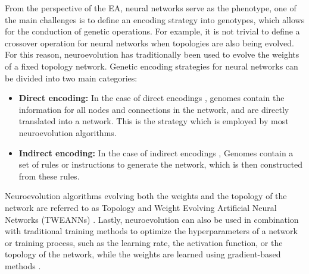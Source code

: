 From the perspective of the EA, neural networks serve as the phenotype, one of the main challenges is to define an encoding strategy into genotypes, which
allows for the conduction of genetic operations. For example, it is not trivial to define a crossover operation for neural networks when topologies are also
being evolved. For this reason, neuroevolution has traditionally  been used to evolve the weights of a fixed topology network. Genetic encoding strategies
for neural networks can be divided into two main categories:

\begin{itemize}
    \item \textbf{Direct encoding:} In the case of direct encodings \cite{neuroevolution_learning,neuroevolution_trends,neuroevolution_survey}, genomes contain the information for
        all nodes and connections in the network, and are directly translated into a network. This is the strategy which is employed by most neuroevolution algorithms.
    \item \textbf{Indirect encoding:} In the case of indirect encodings \cite{neuroevolution_learning,neuroevolution_trends,neuroevolution_survey}, Genomes contain a set of rules or
        instructions to generate the network, which is then constructed from these rules.
\end{itemize}

Neuroevolution algorithms evolving both the weights and the topology of the network are referred to as Topology and Weight Evolving Artificial Neural Networks (TWEANNs) \cite{neat}.
Lastly, neuroevolution can also be used in combination with traditional training methods to optimize the hyperparameters of a network or training process, such as the learning rate, the
activation function, or the topology of the network, while the weights are learned using gradient-based methods \cite{neuroevolution_trends}.
